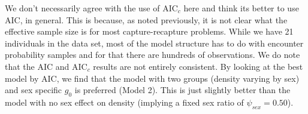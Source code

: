 We don't necessarily agree with the use of AIC$_c$ here and think its
better to use AIC, in general. This is because, as noted previously,
it is not clear what the
effective sample size is for most capture-recapture problems. While we
have 21 individuals in the data set, most of the model structure has
to do with encounter probability samples and for that there are hundreds
of observations. We do note that the AIC and AIC$_c$ results are not
entirely consistent.  By looking at the best model by AIC, we find
that the model with two groups (density varying by sex) and sex specific $g_{0}$ is
preferred (Model 2). This is just slightly better than the model with
no sex effect on density (implying a fixed sex ratio of $\psi_{sex} = 0.50$).



